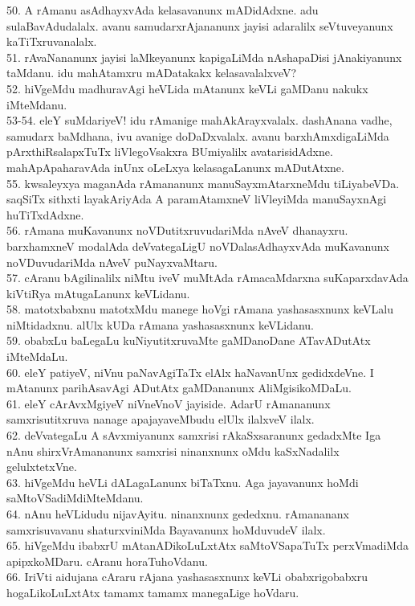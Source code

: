 \documentclass{article}
\begin{document}
50. A rAmanu asAdhayxvAda kelasavanunx mADidAdxne. adu sulaBavAdudalalx. avanu samudarxrAjananunx jayisi adaralilx seVtuveyanunx kaTiTxruvanalalx.\\
51. rAvaNananunx jayisi laMkeyanunx kapigaLiMda nAshapaDisi jAnakiyanunx taMdanu. idu mahAtamxru mADatakakx kelasavalalxveV?\\
52. hiVgeMdu madhuravAgi heVLida mAtanunx keVLi gaMDanu nakukx iMteMdanu.\\
53-54. eleY suMdariyeV! idu rAmanige mahAkArayxvalalx. dashAnana vadhe, samudarx baMdhana, ivu avanige doDaDxvalalx. avanu barxhAmxdigaLiMda pArxthiRsalapxTuTx liVlegoVsakxra BUmiyalilx avatarisidAdxne. mahApApaharavAda inUnx oLeLxya kelasagaLanunx mADutAtxne.\\
55. kwsaleyxya maganAda rAmananunx manuSayxmAtarxneMdu tiLiyabeVDa. saqSiTx sithxti layakAriyAda A paramAtamxneV liVleyiMda manuSayxnAgi huTiTxdAdxne.\\
56. rAmana muKavanunx noVDutitxruvudariMda nAveV dhanayxru. barxhamxneV modalAda deVvategaLigU noVDalasAdhayxvAda muKavanunx noVDuvudariMda nAveV puNayxvaMtaru.\\
57. cAranu bAgilinalilx niMtu iveV muMtAda rAmacaMdarxna suKaparxdavAda kiVtiRya mAtugaLanunx keVLidanu.\\
58. matotxbabxnu matotxMdu manege hoVgi rAmana yashasasxnunx keVLalu niMtidadxnu. alUlx kUDa rAmana yashasasxnunx keVLidanu.\\
59. obabxLu baLegaLu kuNiyutitxruvaMte gaMDanoDane ATavADutAtx iMteMdaLu.\\
60. eleY patiyeV, niVnu paNavAgiTaTx elAlx haNavanUnx gedidxdeVne. I mAtanunx parihAsavAgi ADutAtx gaMDananunx AliMgisikoMDaLu.\\
61. eleY cArAvxMgiyeV niVneVnoV jayiside. AdarU rAmananunx samxrisutitxruva nanage apajayaveMbudu elUlx ilalxveV ilalx.\\
62. deVvategaLu A sAvxmiyanunx samxrisi rAkaSxsaranunx gedadxMte Iga nAnu shirxVrAmananunx samxrisi ninanxnunx oMdu kaSxNadalilx gelulxtetxVne.\\
63. hiVgeMdu heVLi dALagaLanunx biTaTxnu. Aga jayavanunx hoMdi saMtoVSadiMdiMteMdanu.\\
64. nAnu heVLidudu nijavAyitu. ninanxnunx gededxnu. rAmanananx samxrisuvavanu shaturxviniMda Bayavanunx hoMduvudeV ilalx.\\
65. hiVgeMdu ibabxrU mAtanADikoLuLxtAtx saMtoVSapaTuTx perxVmadiMda apipxkoMDaru. cAranu horaTuhoVdanu.\\
66. IriVti aidujana cAraru rAjana yashasasxnunx keVLi obabxrigobabxru hogaLikoLuLxtAtx tamamx tamamx manegaLige hoVdaru.\\
\end{document}
